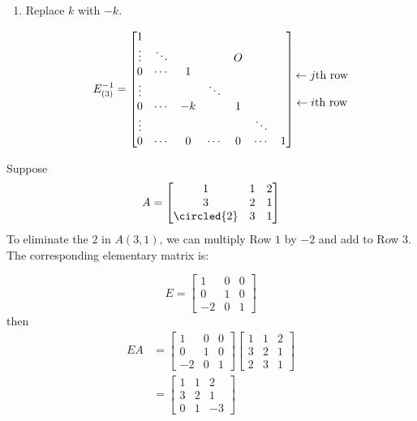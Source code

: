 \begin{enumerate}
\begin{enumerate}
	
	
	
	\item  Replace $k$ with $-k$.
	
	\[ E_{(3)}^{-1}= \begin{bmatrix}    1 &   & &    & & &   \\  \vdots &  \ddots & & & O  & & \\  0  & \cdots & 1 & & & &  \\ \vdots & & & \ddots &  & & \\  0 & \cdots  & -k & & 1 & & \\ \vdots &  & & & & \ddots & \\ 0 & \cdots & 0 & \cdots & 0 & \cdots & 1   \end{bmatrix}  \begin{matrix} \text{ \; }   \\   \text{ \; }   \\  \leftarrow  j \text{th row}   \\   \text{\;}  \\  \leftarrow i \text{th row}  \\ \text{ \; }  \\ \text{ \; } \end{matrix}  \]
	

\end{enumerate}


\begin{example} Suppose 
$$ A = \begin{bmatrix}  1& 1& 2\\ 3 & 2 & 1 \\  {\circled{2}}  & 3  &  1 \end{bmatrix} $$ 
To eliminate the $2$ in $A(3,1)$, we can multiply Row $1$ by $-2$ and add to Row 3.  The corresponding elementary matrix is:

$$ E = \begin{bmatrix}  1& 0& 0\\ 0 & 1 & 0 \\ -2  &  0  &  1 \end{bmatrix} $$ 
then
 \begin{align*}
  EA  &= \begin{bmatrix}  1& 0& 0\\ 0 & 1 & 0 \\ -2  &  0  &  1 \end{bmatrix}  \begin{bmatrix}  1& 1& 2\\ 3 & 2 & 1 \\  {{2}}  & 3  &  1 \end{bmatrix} \\
  &= 
  \begin{bmatrix}  
  	1  &   1 &    2 \\
     	3  &    2  &    1\\
     	0  &    1   &  -3
     \end{bmatrix}
 \end{align*}
  \end{example}





\end{enumerate}
